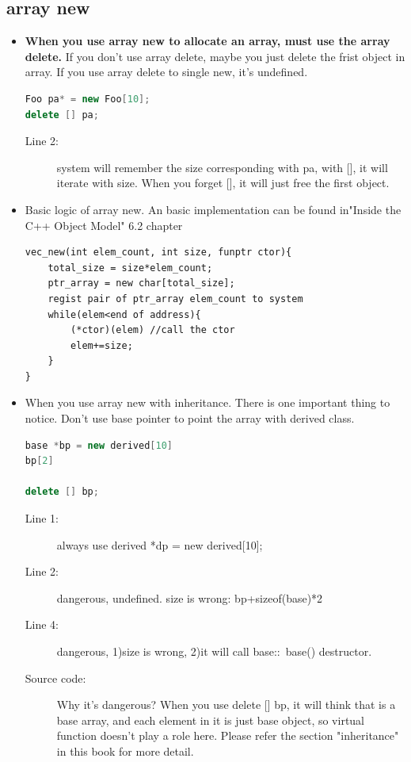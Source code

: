 \documentclass[a4paper,11pt,twoside]{book}
\begin{document}
\subsection{array new}
\begin{itemize}
	\item \textbf{When you use array new to allocate an array, must use the array delete.} If you don't use array delete, maybe you just delete the frist object in array. If you use array delete to single new, it's undefined. 
\begin{lstlisting}[frame=single, language=c++]
Foo pa* = new Foo[10];
delete [] pa;
\end{lstlisting}

\begin{description}
	\item[Line 2:] system will remember the size corresponding with pa,  with [], it will iterate with size.  When you forget [], it will just free the first object.
\end{description}

	\item Basic logic of array new. An basic implementation can be found in"Inside the C++ Object Model" 6.2 chapter
\begin{lstlisting}[numbers=none]
vec_new(int elem_count, int size, funptr ctor){
	total_size = size*elem_count;
	ptr_array = new char[total_size];
	regist pair of ptr_array elem_count to system
	while(elem<end of address){
		(*ctor)(elem) //call the ctor
		elem+=size;
	}
}
\end{lstlisting}
	
	\item When you use array new with inheritance. There is one important thing to notice. Don't use base pointer to point the array with derived class. 
\begin{lstlisting}[frame=single, language=c++]
base *bp = new derived[10]
bp[2] 
	
delete [] bp;
\end{lstlisting}
\begin{description}
	\item[Line 1:] always use derived *dp = new derived[10];
	\item[Line 2:] dangerous, undefined. size is wrong: bp+sizeof(base)*2
	\item[Line 4:] dangerous, 1)size is wrong, 2)it will call base::~base() destructor. 
	\item[Source code:] Why it's dangerous? When you use delete [] bp, it will think that is a base array, and each element in it is just base object, so virtual function doesn't play a role here. Please refer the section "inheritance" in this book for more detail.
\end{description}

\end{itemize}
\end{document}
